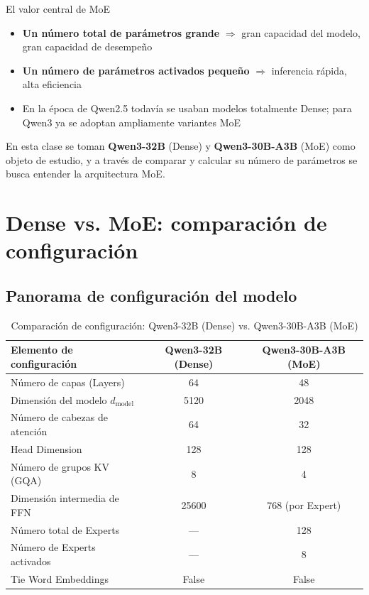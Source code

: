 \documentclass[a4paper]{article}
\begin{document}
\begin{importantbox}{El valor central de MoE}
\begin{itemize}
  \item \textbf{Un número total de parámetros grande} $\Rightarrow$ gran capacidad del modelo, gran capacidad de desempeño
  \item \textbf{Un número de parámetros activados pequeño} $\Rightarrow$ inferencia rápida, alta eficiencia
  \item En la época de Qwen2.5 todavía se usaban modelos totalmente Dense; para Qwen3 ya se adoptan ampliamente variantes MoE
\end{itemize}
\end{importantbox}

En esta clase se toman \textbf{Qwen3-32B} (Dense) y \textbf{Qwen3-30B-A3B} (MoE) como objeto de estudio, y a través de comparar y calcular su número de parámetros se busca entender la arquitectura MoE.
\section{Dense vs. MoE: comparación de configuración}

\subsection{Panorama de configuración del modelo}

\begin{table}[H]
\centering
\caption{Comparación de configuración: Qwen3-32B (Dense) vs. Qwen3-30B-A3B (MoE)}
\begin{tabular}{lcc}
\toprule
\textbf{Elemento de configuración} & \textbf{Qwen3-32B (Dense)} & \textbf{Qwen3-30B-A3B (MoE)} \\
\midrule
Número de capas (Layers) & 64 & 48 \\
Dimensión del modelo $d_{\text{model}}$ & 5120 & 2048 \\
Número de cabezas de atención & 64 & 32 \\
Head Dimension & 128 & 128 \\
Número de grupos KV (GQA) & 8 & 4 \\
Dimensión intermedia de FFN & 25600 & 768 (por Expert) \\
Número total de Experts & — & 128 \\
Número de Experts activados & — & 8 \\
Tie Word Embeddings & False & False \\
\bottomrule
\end{tabular}
\end{table}
\end{document}
